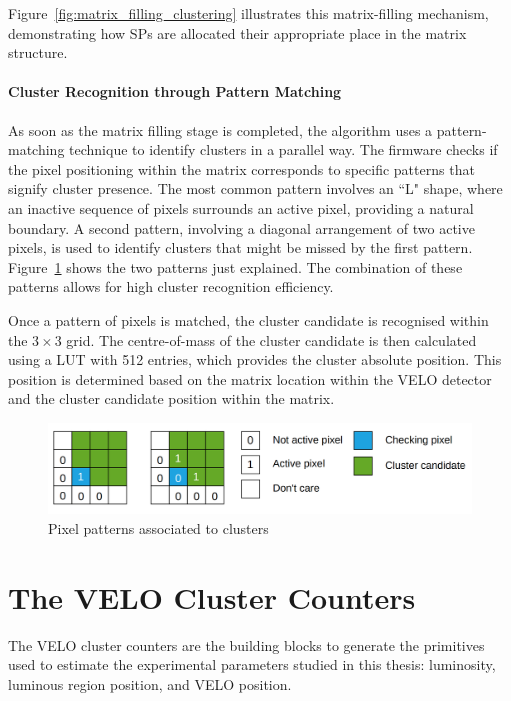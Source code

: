 Figure~\ref{fig:matrix_filling_clustering} illustrates this matrix-filling mechanism, demonstrating how SPs are allocated their appropriate place in the matrix structure.


\paragraph{Cluster Recognition through Pattern Matching}
As soon as the matrix filling stage is completed, the algorithm uses a pattern-matching technique to identify clusters in a parallel way. The firmware checks if the pixel positioning within the matrix corresponds to specific patterns that signify cluster presence. The most common pattern involves an ``L" shape, where an inactive sequence of pixels surrounds an active pixel, providing a natural boundary. A second pattern, involving a diagonal arrangement of two active pixels, is used to identify clusters that might be missed by the first pattern. Figure~\ref{fig:cluster_recognition} shows the two patterns just explained. The combination of these patterns allows for high cluster recognition efficiency.

Once a pattern of pixels is matched, the cluster candidate is recognised within the $3\times3$ grid. The centre-of-mass of the cluster candidate is then calculated using a LUT with 512 entries, which provides the cluster absolute position. This position is determined based on the matrix location within the VELO detector and the cluster candidate position within the matrix.

\begin{figure}
    \centering
    \includegraphics[width=\textwidth]{figures/cluster_recognition.png}
    \caption{Pixel patterns associated to clusters}
    \label{fig:cluster_recognition}
\end{figure}

\section{The VELO Cluster Counters}\label{sec:velo_counters}
The VELO cluster counters are the building blocks to generate the primitives used to estimate the experimental parameters studied in this thesis: luminosity, luminous region position, and VELO position. 

